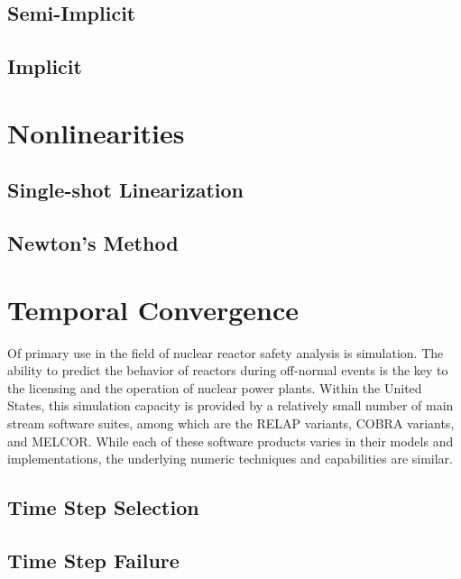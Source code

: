 \subsection{Semi-Implicit}
\label{subsect:coupling_semi_implicit}

\subsection{Implicit}
\label{subsect:coupling_implicit}

\section{Nonlinearities}
\label{sect:nonlinearities}

\subsection{Single-shot Linearization}
\label{subsect:single_shot}

\subsection{Newton's Method}
\label{subsect:newtons_method}


\section{Temporal Convergence}
\label{sect:temporal_convergence}
Of primary use in the field of nuclear reactor safety analysis is simulation.
The ability to predict the behavior of reactors during off-normal events is the key to the licensing and the operation of nuclear power plants.
Within the United States, this simulation capacity is provided by a relatively small number of main stream software suites, among which are the RELAP variants, COBRA variants, and MELCOR.
While each of these software products varies in their models and implementations, the underlying numeric techniques and capabilities are similar.

\subsection{Time Step Selection}
\label{subsect:time_step_selection}


\subsection{Time Step Failure}
\label{subsect:time_step_failure}

